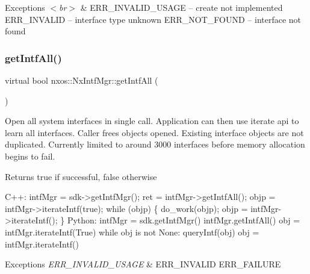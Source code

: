 \begin{DoxyExceptions}{Exceptions}
{\em $<$br$>$} & E\+R\+R\+\_\+\+I\+N\+V\+A\+L\+I\+D\+\_\+\+U\+S\+A\+GE -- \textquotesingle{}create\textquotesingle{} not implemented E\+R\+R\+\_\+\+I\+N\+V\+A\+L\+ID -- interface type unknown E\+R\+R\+\_\+\+N\+O\+T\+\_\+\+F\+O\+U\+ND -- interface not found \\
\hline
\end{DoxyExceptions}
\mbox{\label{classnxos_1_1_nx_intf_mgr_af70ee700e633a9f5ae35608d7637ee04}} 
\subsubsection{\texorpdfstring{get\+Intf\+All()}{getIntfAll()}}
{\footnotesize\ttfamily virtual bool nxos\+::\+Nx\+Intf\+Mgr\+::get\+Intf\+All (\begin{DoxyParamCaption}{ }\end{DoxyParamCaption})\hspace{0.3cm}{\ttfamily [pure virtual]}}

Open all system interfaces in single call. Application can then use iterate api to learn all interfaces. Caller frees objects opened. Existing interface objects are not duplicated. Currently limited to around 3000 interfaces before memory allocation begins to fail.

\begin{DoxyReturn}{Returns}
true if successful, false otherwise
\end{DoxyReturn}

\begin{DoxyCode}
C++:
   intfMgr = sdk->getIntfMgr();
   ret = intfMgr->getIntfAll();
   objp = intfMgr->iterateIntf(\textcolor{keyword}{true});
   \textcolor{keywordflow}{while} (objp) \{
        do\_work(objp);
        objp = intfMgr->iterateIntf();
    \}
Python:
   intfMgr = sdk.getIntfMgr()
   intfMgr.getIntfAll()  
   obj = intfMgr.iterateIntf(True)
   \textcolor{keywordflow}{while} obj is not None:
      queryIntf(obj)
      obj = intfMgr.iterateIntf()
\end{DoxyCode}



\begin{DoxyExceptions}{Exceptions}
{\em E\+R\+R\+\_\+\+I\+N\+V\+A\+L\+I\+D\+\_\+\+U\+S\+A\+GE} & E\+R\+R\+\_\+\+I\+N\+V\+A\+L\+ID E\+R\+R\+\_\+\+F\+A\+I\+L\+U\+RE \\
\hline
\end{DoxyExceptions}
\mbox{\label{classnxos_1_1_nx_intf_mgr_af3fff8d1738bc43b2441a8b868984665}} 
